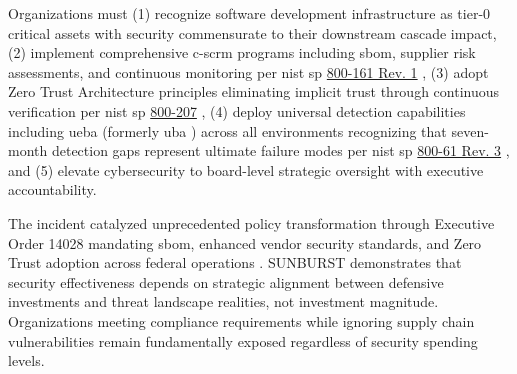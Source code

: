  Organizations must (1) recognize software development infrastructure as tier-0 critical assets with security commensurate to their downstream cascade impact, (2) implement comprehensive \gls{c-scrm} programs including \gls{sbom}, supplier risk assessments, and continuous monitoring per \gls{nist} \gls{sp} \href{https://csrc.nist.gov/pubs/sp/800/161/r1/upd1/final}{800-161 Rev. 1} \cite{boyens_cybersecurity_2022}, (3) adopt Zero Trust Architecture principles eliminating implicit trust through continuous verification per \gls{nist} \gls{sp} \href{https://csrc.nist.gov/pubs/sp/800/207/final}{800-207} \cite{rose_zero_2020}, (4) deploy universal detection capabilities including \gls{ueba} \cite{litan_market_2015, sadowski_market_2019} (formerly \gls{uba} \cite{litan_market_2014}) across all environments recognizing that seven-month detection gaps represent ultimate failure modes per \gls{nist} \gls{sp} \href{https://csrc.nist.gov/pubs/sp/800/61/r3/final}{800-61 Rev. 3} \cite{nelson_incident_2025}, and (5) elevate cybersecurity to board-level strategic oversight with executive accountability.

The incident catalyzed unprecedented policy transformation through Executive Order 14028 mandating \gls{sbom}, enhanced vendor security standards, and Zero Trust adoption across federal operations \cite{us_eo_2021}. SUNBURST demonstrates that security effectiveness depends on strategic alignment between defensive investments and threat landscape realities, not investment magnitude. Organizations meeting compliance requirements while ignoring supply chain vulnerabilities remain fundamentally exposed regardless of security spending levels.
